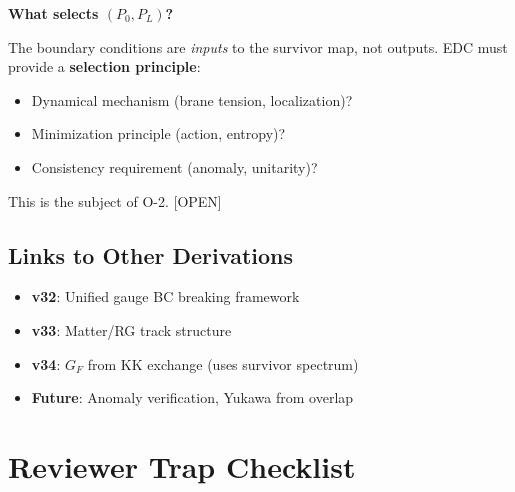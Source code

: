\documentclass[11pt,a4paper]{article}
\newcommand{\tagOPEN}{\textcolor{red!70!black}{[OPEN]}}
\begin{document}
\begin{openbox}
\textbf{What selects $(P_0, P_L)$?}

The boundary conditions are \textit{inputs} to the survivor map, not outputs.
EDC must provide a \textbf{selection principle}:
\begin{itemize}
    \item Dynamical mechanism (brane tension, localization)?
    \item Minimization principle (action, entropy)?
    \item Consistency requirement (anomaly, unitarity)?
\end{itemize}
This is the subject of O-2. \tagOPEN
\end{openbox}

\subsection{Links to Other Derivations}

\begin{itemize}
    \item \textbf{v32}: Unified gauge BC breaking framework
    \item \textbf{v33}: Matter/RG track structure
    \item \textbf{v34}: $G_F$ from KK exchange (uses survivor spectrum)
    \item \textbf{Future}: Anomaly verification, Yukawa from overlap
\end{itemize}

\section{Reviewer Trap Checklist}
\end{document}
